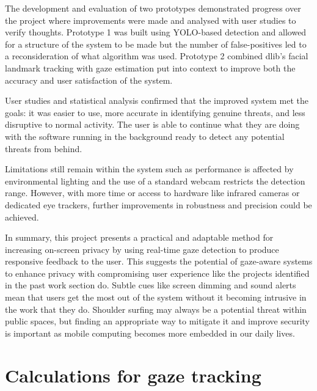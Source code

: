 \documentclass[12pt]{article}
\theoremstyle{plain}
\theoremstyle{definition}
\begin{document}
The development and evaluation of two prototypes demonstrated progress over the project where improvements were made and analysed with user studies to verify thoughts. Prototype 1 was built using YOLO-based detection and allowed for a structure of the system to be made but the number of false-positives led to a reconsideration of what algorithm was used. Prototype 2 combined dlib’s facial landmark tracking with gaze estimation put into context to improve both the accuracy and user satisfaction of the system.

User studies and statistical analysis confirmed that the improved system met the goals: it was easier to use, more accurate in identifying genuine threats, and less disruptive to normal activity. The user is able to continue what they are doing with the software running in the background ready to detect any potential threats from behind.

Limitations still remain within the system such as performance is affected by environmental lighting and the use of a standard webcam restricts the detection range. However, with more time or access to hardware like infrared cameras or dedicated eye trackers, further improvements in robustness and precision could be achieved.

In summary, this project presents a practical and adaptable method for increasing on-screen privacy by using real-time gaze detection to produce responsive feedback to the user. This suggests the potential of gaze-aware systems to enhance privacy with compromising user experience like the projects identified in the past work section do. Subtle cues like screen dimming and sound alerts mean that users get the most out of the system without it becoming intrusive in the work that they do. Shoulder surfing may always be a potential threat within public spaces, but finding an appropriate way to mitigate it and improve security is important as mobile computing becomes more embedded in our daily lives.

\newpage
\printbibliography 

\clearpage\appendix

\section{Calculations for gaze tracking}
\label{app:gaze_calcs}


\end{document}
